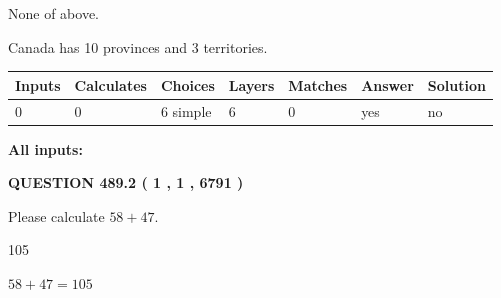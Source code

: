 \documentclass[12pt]{article}
\begin{document}
 
 None of above.
 
 
\noindent{}
 
 
Canada has 10  provinces and 3 territories.
 
 
\noindent{}
 
 
   
   
   
   
\noindent\begin{tabular}{|l|l|l|l|l|l|l|}
 \hline
Inputs & Calculates & Choices & Layers & Matches & Answer & Solution \\ \hline
 0  & 
 0  & 
 6
  simple  
  & 
 6  & 
 0  & 
  yes & 
  no 
  \\ \hline
 \end{tabular}
   
   
   
   
\noindent{}
   
   
   
   
\noindent\vspace{0.1in}\hspace{-0.08in} {\textbf{\Large{All inputs: }}}
   
   
  
\vspace{0.2in}
  
{\textbf{\Large{QUESTION
489.2 
 ( 1 , 1 , 6791 )
}}}
  
  
 
Please calculate $ %
58 +  %
47 $.
 
 
 
\noindent{}
 
 

105
 
 
\noindent{}
 
 

 
 
 
\noindent{}
 
 

$ %
58 +  %
47=   %
105$
 
\end{document}
